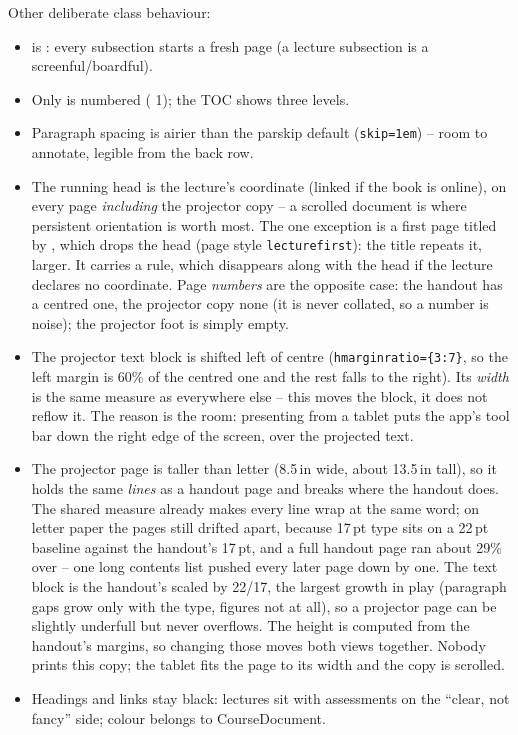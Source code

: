 Other deliberate class behaviour:

\begin{itemize}
  \item {} is : every subsection starts a
    fresh page (a lecture subsection is a screenful/boardful).
  \item Only  is numbered ( 1); the TOC shows
    three levels.
  \item Paragraph spacing is airier than the parskip default
    (\texttt{skip=1em}) -- room to annotate, legible from the back row.
  \item The running head is the lecture's  coordinate
    (linked if the book is online), on every page \emph{including} the
    projector copy -- a scrolled
    document is where persistent orientation is worth most.
    The one exception is a first page titled by , which drops
    the head (page style \texttt{lecturefirst}): the title repeats it, larger. It carries a
    rule, which disappears along with the head if the lecture declares no
    coordinate. Page \emph{numbers} are the opposite case: the handout has a
    centred one, the projector copy none (it is never collated, so a number
    is noise); the projector foot is simply empty.
  \item The projector text block is shifted left of centre
    (\texttt{hmarginratio=\{3:7\}}, so the left margin is 60\% of the centred
    one and the rest falls to the right). Its \emph{width} is the same measure
    as everywhere else -- this moves the block, it does not reflow it. The
    reason is the room: presenting from a tablet puts the app's tool bar down
    the right edge of the screen, over the projected text.
  \item The projector page is taller than letter (8.5\,in wide, about 13.5\,in tall), so it holds the same \emph{lines} as a handout page and breaks where the handout does.
    The shared measure already makes every line wrap at the same word; on letter paper the pages still drifted apart, because 17\,pt type sits on a 22\,pt baseline against the handout's 17\,pt, and a full handout page ran about 29\% over -- one long contents list pushed every later page down by one.
    The text block is the handout's scaled by 22/17, the largest growth in play (paragraph gaps grow only with the type, figures not at all), so a projector page can be slightly underfull but never overflows.
    The height is computed from the handout's margins, so changing those moves both views together.
    Nobody prints this copy; the tablet fits the page to its width and the copy is scrolled.
  \item Headings and links stay black: lectures sit with assessments on
    the ``clear, not fancy'' side; colour belongs to CourseDocument.
\end{itemize}

